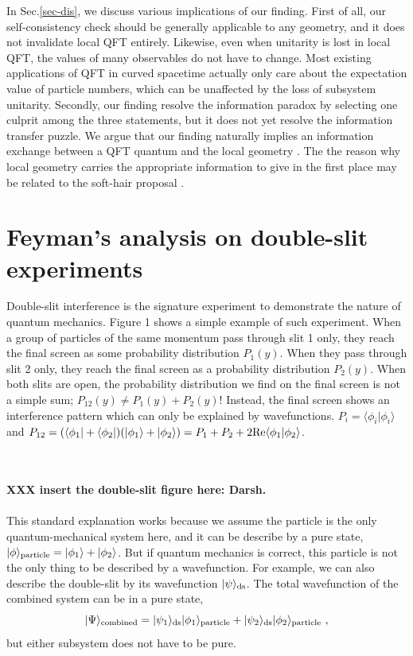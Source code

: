 \documentclass[aps,showpacs,twocolumn,floats,prd,superscriptaddress,nofootinbib]{revtex4-1}
\begin{document}
In Sec.\ref{sec-dis}, we discuss various implications of our finding. 
First of all, our self-consistency check should be generally applicable to any geometry, and it does not invalidate local QFT entirely. 
Likewise, even when unitarity is lost in local QFT, the values of many observables do not have to change. 
Most existing applications of QFT in curved spacetime actually only care about the expectation value of particle numbers, which can be unaffected by the loss of subsystem unitarity. 
Secondly, our finding resolve the information paradox by selecting one culprit among the three statements, but it does not yet resolve the information transfer puzzle. 
We argue that our finding naturally implies an information exchange between a QFT quantum and the local geometry \cite{OsuPag16}.
The the reason why local geometry carries the appropriate information to give in the first place may be related to the soft-hair proposal \cite{HawPer16}. 

\section{Feyman's analysis on double-slit experiments}
\label{sec-DoubleSlit}

Double-slit interference is the signature experiment to demonstrate the nature of quantum mechanics. Figure 1 shows a simple example of such experiment.
When a group of particles of the same momentum pass through slit 1 only, they reach the final screen as some probability distribution $P_1(y)$. 
When they pass through slit 2 only, they reach the final screen as a probability distribution $P_2(y)$.
When both slits are open, the probability distribution we find on the final screen is not a simple sum; $P_{12}(y) \neq P_1(y) + P_2(y)$! 
Instead, the final screen shows an interference pattern which can only be explained by wavefunctions.
$P_i = \langle \phi_i | \phi_i \rangle$ and $P_{12} = (\langle \phi_1|+\langle \phi_2| ) (|\phi_1\rangle + | \phi_2 \rangle)=P_1 + P_2 + 2{\rm Re}\langle\phi_1|\phi_2\rangle$.

\ \\ \ \\
{\bf XXX insert the double-slit figure here: Darsh.}
\ \\ \ \\

This standard explanation works because we assume the particle is the only quantum-mechanical system here, and it can be describe by a pure state, $|\phi\rangle_{\rm particle} = |\phi_1\rangle + |\phi_2\rangle$.
But if quantum mechanics is correct, this particle is not the only thing to be described by a wavefunction. 
For example, we can also describe the double-slit by its wavefunction $|\psi\rangle_{\rm ds}$. The total wavefunction of the combined system can be in a pure state,
\begin{equation}
|\Psi\rangle_{\rm combined} = |\psi_1\rangle_{\rm ds}|\phi_1\rangle_{\rm particle} 
+ |\psi_2\rangle_{\rm ds}|\phi_2\rangle_{\rm particle} ~,
\end{equation}
but either subsystem does not have to be pure.
\end{document}
